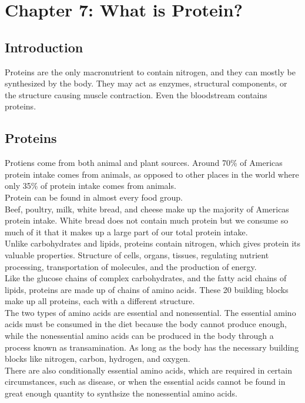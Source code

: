 \documentclass[letterpaper, 11pt]{article}
\begin{document}
\section{Chapter 7: What is Protein?}
\label{sec:org275a42e}
\subsection{Introduction}
\label{sec:org2c8dad2}
Proteins are the only macronutrient to contain nitrogen, and they can mostly be synthesized by the body. They may act as enzymes, structural components, or the structure causing muscle contraction. Even the bloodstream contains proteins.\\
\subsection{Proteins}
\label{sec:orga7f46b6}
Protiens come from both animal and plant sources. Around 70\% of Americas protein intake comes from animals, as opposed to other places in the world where only 35\% of protein intake comes from animals.\\
Protein can be found in almost every food group.\\
Beef, poultry, milk, white bread, and cheese make up the majority of Americas protein intake. White bread does not contain much protein but we consume so much of it that it makes up a large part of our total protein intake.\\
Unlike carbohydrates and lipids, proteins contain nitrogen, which gives protein its valuable properties. Structure of cells, organs, tissues, regulating nutrient processing, transportation of molecules, and the production of energy.\\
Like the glucose chains of complex carbohydrates, and the fatty acid chains of lipids, proteins are made up of chains of amino acids. These 20 building blocks make up all proteins, each with a different structure.\\
The two types of amino acids are essential and nonessential. The essential amino acids must be consumed in the diet because the body cannot produce enough, while the nonessential amino acids can be produced in the body through a process known as transamination. As long as the body has the necessary building blocks like nitrogen, carbon, hydrogen, and oxygen.\\
There are also conditionally essential amino acids, which are required in certain circumstances, such as disease, or when the essential acids cannot be found in great enough quantity to synthsize the nonessential amino acids.\\
\end{document}
